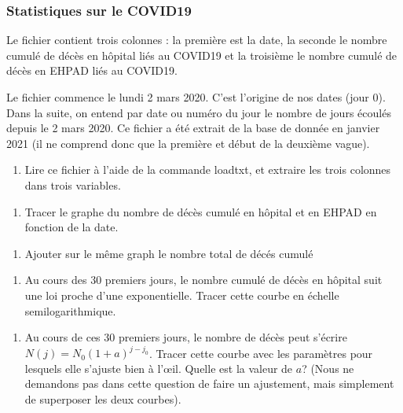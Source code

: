 \documentclass[letterpaper,10pt,english]{sphinxhowto}
\begin{document}
\subsubsection{Statistiques sur le COVID\sphinxhyphen{}19}
\label{\detokenize{cours7_graphiques_exercices:statistiques-sur-le-covid-19}}
\sphinxAtStartPar
Le fichier  contient trois colonnes : la première est la date, la seconde le nombre cumulé de décès en hôpital liés au COVID\sphinxhyphen{}19 et la troisième le nombre cumulé de décès en EHPAD liés au COVID\sphinxhyphen{}19.

\sphinxAtStartPar
Le fichier commence le lundi 2 mars 2020. C’est l’origine de nos dates (jour 0). Dans la suite, on entend par date ou numéro du jour le nombre de jours écoulés depuis le 2 mars 2020. Ce fichier a été extrait de la base de donnée en janvier 2021 (il ne comprend donc que la première et début de la deuxième vague).
\begin{enumerate}
%
\item {} 
\sphinxAtStartPar
Lire ce fichier à l’aide de la commande loadtxt, et extraire les trois colonnes dans trois variables.

\end{enumerate}
\begin{enumerate}
%
\setcounter{enumi}{1}
\item {} 
\sphinxAtStartPar
Tracer le graphe du nombre de décès cumulé en hôpital et en EHPAD en fonction de la date.

\end{enumerate}
\begin{enumerate}
%
\setcounter{enumi}{2}
\item {} 
\sphinxAtStartPar
Ajouter sur le même graph le nombre total de décés cumulé

\end{enumerate}
\begin{enumerate}
%
\setcounter{enumi}{3}
\item {} 
\sphinxAtStartPar
Au cours des 30 premiers jours, le nombre cumulé de décès en hôpital suit une loi proche d’une exponentielle. Tracer cette courbe en échelle semi\sphinxhyphen{}logarithmique.

\end{enumerate}
\begin{enumerate}
%
\setcounter{enumi}{4}
\item {} 
\sphinxAtStartPar
Au cours de ces 30 premiers jours, le nombre de décès peut s’écrire \(N(j) = N_0(1+a)^{j-j_0}\). Tracer cette courbe avec les paramètres pour lesquels elle s’ajuste bien à l’œil. Quelle est la valeur de \(a\)? (Nous ne demandons pas dans cette question de faire un ajustement, mais simplement de superposer les deux courbes).

\end{enumerate}
\end{document}
